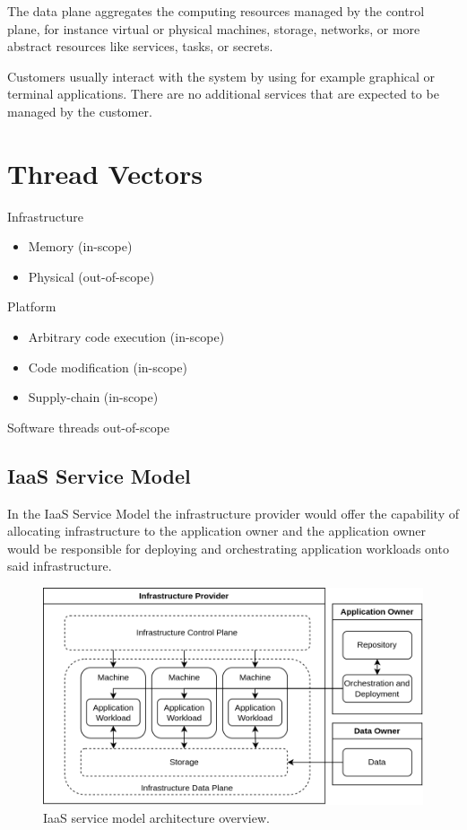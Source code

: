 The data plane aggregates the computing resources managed by the control plane,
for instance virtual or physical machines, storage, networks, or more abstract
resources like services, tasks, or secrets.

Customers usually interact with the system by using for example graphical or
terminal applications. There are no additional services that are expected to be
managed by the customer.

\section{Thread Vectors}

Infrastructure
\begin{itemize}
  \item Memory (in-scope)
  \item Physical (out-of-scope)
\end{itemize}

Platform
\begin{itemize}
  \item Arbitrary code execution (in-scope)
  \item Code modification (in-scope)
  \item Supply-chain (in-scope)
\end{itemize}

Software threads out-of-scope

\subsection{IaaS Service Model}

In the IaaS Service Model the infrastructure provider would offer the capability
of allocating infrastructure to the application owner and the application owner
would be responsible for deploying and orchestrating application workloads onto
said infrastructure.

\begin{figure}[ht]
  \centering
  \includegraphics[width=0.8\linewidth]{resources/distributed-computing-infrastructure-architecture.png}
  \caption{IaaS service model architecture overview.}
  \label{fig:iaas-model-architecture}
\end{figure}

